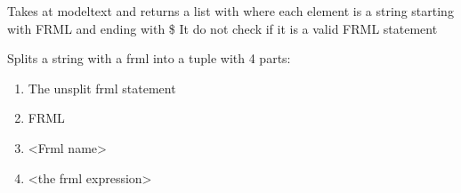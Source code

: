 \documentclass[letterpaper,10pt,english]{sphinxmanual}
\begin{document}

\begin{fulllineitems}
\label{\detokenize{core/modelpattern:modelpattern.udtrykre}}
\pysigstartsignatures
{}
\pysigstopsignatures
\end{fulllineitems}


\begin{fulllineitems}
\label{\detokenize{core/modelpattern:modelpattern.find_frml}}
\pysigstartsignatures
{}
\pysigstopsignatures
\sphinxAtStartPar
Takes at modeltext and returns a list with where each element is
a string starting  with FRML and ending with \$
It do not check if it is a valid FRML statement

\end{fulllineitems}


\begin{fulllineitems}
\label{\detokenize{core/modelpattern:modelpattern.split_frml}}
\pysigstartsignatures
{}
\pysigstopsignatures
\sphinxAtStartPar
Splits a string with a frml into a tuple with 4 parts:
\begin{enumerate}
%
\setcounter{enumi}{-1}
\item {} 
\sphinxAtStartPar
The unsplit frml statement

\item {} 
\sphinxAtStartPar
FRML

\item {} 
\sphinxAtStartPar
\textless{}Frml name\textgreater{}

\item {} 
\sphinxAtStartPar
\textless{}the frml expression\textgreater{}

\end{enumerate}

\end{fulllineitems}
\end{document}
